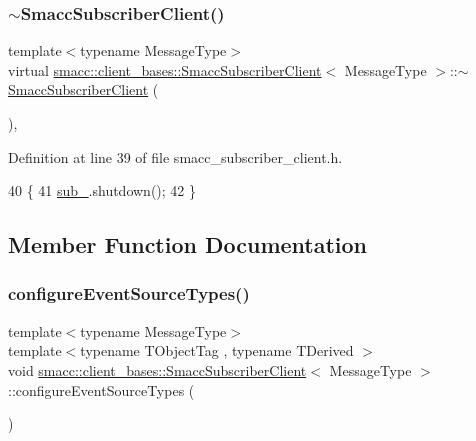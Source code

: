 \subsubsection{\texorpdfstring{$\sim$\+Smacc\+Subscriber\+Client()}{~SmaccSubscriberClient()}}
{\footnotesize\ttfamily template$<$typename Message\+Type$>$ \\
virtual \hyperlink{classsmacc_1_1client__bases_1_1SmaccSubscriberClient}{smacc\+::client\+\_\+bases\+::\+Smacc\+Subscriber\+Client}$<$ Message\+Type $>$\+::$\sim$\hyperlink{classsmacc_1_1client__bases_1_1SmaccSubscriberClient}{Smacc\+Subscriber\+Client} (\begin{DoxyParamCaption}{ }\end{DoxyParamCaption})\hspace{0.3cm}{\ttfamily [inline]}, {\ttfamily [virtual]}}



Definition at line 39 of file smacc\+\_\+subscriber\+\_\+client.\+h.


\begin{DoxyCode}
40   \{
41     \hyperlink{classsmacc_1_1client__bases_1_1SmaccSubscriberClient_a0f69a1b0a284ae47f5d717c6ab95f089}{sub\_}.shutdown();
42   \}
\end{DoxyCode}


\subsection{Member Function Documentation}
\mbox{\label{classsmacc_1_1client__bases_1_1SmaccSubscriberClient_adf0e61d4a0b34ecc76fb9f4c3d04ef97}} 
\subsubsection{\texorpdfstring{configure\+Event\+Source\+Types()}{configureEventSourceTypes()}}
{\footnotesize\ttfamily template$<$typename Message\+Type$>$ \\
template$<$typename T\+Object\+Tag , typename T\+Derived $>$ \\
void \hyperlink{classsmacc_1_1client__bases_1_1SmaccSubscriberClient}{smacc\+::client\+\_\+bases\+::\+Smacc\+Subscriber\+Client}$<$ Message\+Type $>$\+::configure\+Event\+Source\+Types (\begin{DoxyParamCaption}{ }\end{DoxyParamCaption})\hspace{0.3cm}{\ttfamily [inline]}}



